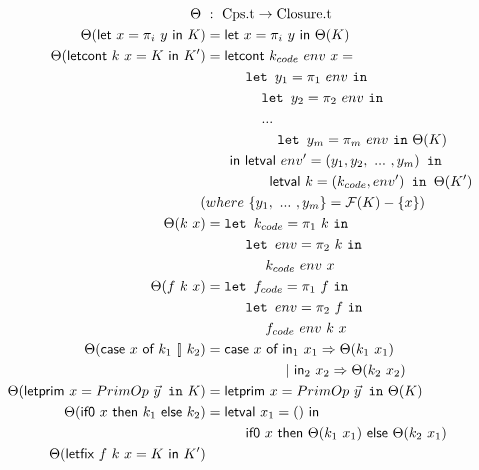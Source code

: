 \documentclass{article}
\theoremstyle{definition}
\theoremstyle{remark}
\numberwithin{equation}{section}
\begin{document}
\begin{figure}[!ht]
  \centering
\begin{align*}
\Theta\ &:\ \textrm{Cps.t} \to \textrm{Closure.t}\\     %
\Theta(\textsf{let }x=\pi _i\ y\textsf{ in }K)
    &=\textsf{let }x=\pi _i\ y\textsf{ in }\Theta(K)\\   %
\Theta(\textsf{letcont }k\ x=K\textsf{ in }K')
    &=\textsf{letcont }k_{code}\ env\ x=\\
    &\kern1cm   \texttt{let }y_1=\pi _1\ env\ \texttt{in}\\
    &\kern1.4cm   \texttt{let }y_2=\pi _2\ env\ \texttt{in}\\
    &\kern1.4cm   ...\\
    &\kern1.8cm   \texttt{let }y_m=\pi _m\ env\ \texttt{in}\ \Theta(K)\\
    &\kern0.6cm\textsf{in letval }env'=(y_1, y_2, \ ...\ ,y_m)\texttt{ in}\\
    &\kern1.6cm\textsf{letval }k=(k_{code}, env')\texttt{ in }\Theta(K')\\ %
    (&where\ \{y_1,\ ...\ ,y_m\}=\mathcal{F}(K)-\{x\})\\
\Theta(k\ x)
    &=\texttt{let }k_{code}=\pi _1\ k\ \texttt{in}\\
    &\kern1cm   \texttt{let }env=\pi _2\ k\ \texttt{in}\\
    &\kern1.5cm  k_{code}\ env\ x\\   %
\Theta(f\ k\ x)
    &=\texttt{let }f_{code}=\pi _1\ f\ \texttt{in}\\
    &\kern1cm   \texttt{let }env=\pi _2\ f\ \texttt{in}\\
    &\kern1.5cm  f_{code}\ env\ k \ x\\   %
\Theta(\textsf{case }x\textsf{ of }k_1\ [\!]\ k_2)
    &=\textsf{case }x\textsf{ of in}_1\ x_1\Rightarrow \Theta(k_1\ x_1)\\
    &\kern2cm  |\ \textsf{in}_2\ x_2\Rightarrow \Theta(k_2\ x_2)\\   %
\Theta(\textsf{letprim }x=PrimOp\ \vec{y}\texttt{ in}\ K)
    &=\textsf{letprim }x=PrimOp\ \vec{y}\texttt{ in}\ \Theta(K)\\   %
\Theta(\textsf{if0 }x\textsf{ then }k_1\ \textsf{else }k_2)
    &=\textsf{letval }x_1=()\textsf{ in}\\
    &\kern1cm \textsf{if0 }x\textsf{ then }\Theta(k_1\ x_1)
    \ \textsf{else }\Theta(k_2\ x_1)\\
\Theta(\textsf{letfix }f\ k\ x=K\textsf{ in }K')   %

\end{align*}
\end{figure}
\end{document}
